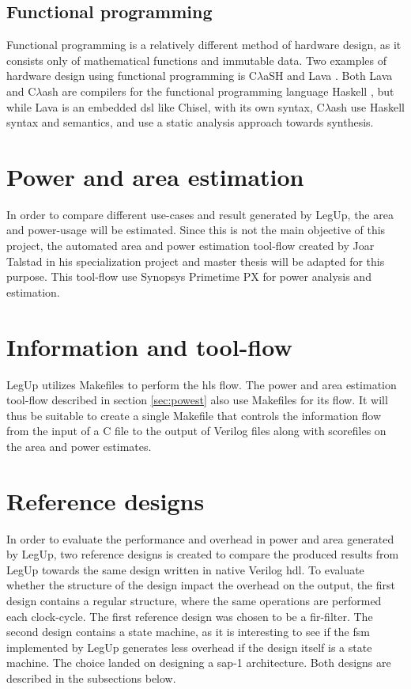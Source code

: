 \subsection{Functional programming}
Functional programming is a relatively different method of hardware design, as it consists only of mathematical functions and immutable data. Two examples of hardware design using functional programming is C$\lambda$aSH \cite{baaij2009clash} and Lava \cite{bjesse1998lava}. Both Lava and C$\lambda$ash are compilers for the functional programming language Haskell \cite{haskellonline}, but while Lava is an embedded \gls{dsl} like Chisel, with its own syntax, C$\lambda$ash use Haskell syntax and semantics, and use a static analysis approach towards synthesis.

\section{\label{sec:powest}Power and area estimation}
In order to compare different use-cases and result generated by LegUp, the area and power-usage will be estimated. Since this is not the main objective of this project, the automated area and power estimation tool-flow created by Joar Talstad in his specialization project \cite{talstad14project} and master thesis \cite{talstad15master} will be adapted for this purpose. This tool-flow use Synopsys Primetime PX for power analysis and estimation.

\section{Information and tool-flow}
LegUp utilizes Makefiles to perform the \gls{hls} flow. The power and area estimation tool-flow described in section \ref{sec:powest} also use Makefiles for its flow. It will thus be suitable to create a single Makefile that controls the information flow from the input of a C file to the output of Verilog files along with scorefiles on the area and power estimates. 

\section{Reference designs}
In order to evaluate the performance and overhead in power and area generated by LegUp, two reference designs is created to compare the produced results from LegUp towards the same design written in native Verilog \gls{hdl}. To evaluate whether the structure of the design impact the overhead on the output, the first design contains a regular structure, where the same operations are performed each clock-cycle. The first reference design was chosen to be a \gls{fir}-filter. The second design contains a state machine, as it is interesting to see if the \gls{fsm} implemented by LegUp generates less overhead if the design itself is a state machine. The choice landed on designing a \gls{sap-1} architecture. Both designs are described in the subsections below.

